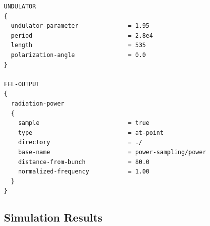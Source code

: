 \begin{snugshade}
\begin{Verbatim}[fontsize=\small, tabsize = 4]
UNDULATOR
{
  undulator-parameter              = 1.95
  period                           = 2.8e4
  length                           = 535
  polarization-angle               = 0.0
}

FEL-OUTPUT
{
  radiation-power
  {
    sample                         = true
    type                           = at-point
    directory                      = ./
    base-name                      = power-sampling/power
    distance-from-bunch            = 80.0
    normalized-frequency           = 1.00
  }
}
\end{Verbatim}
\end{snugshade}

\subsection{Simulation Results}

